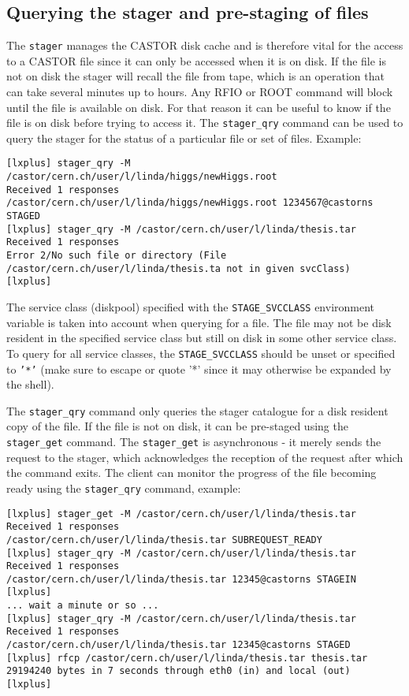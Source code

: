 \subsection{Querying the stager and pre-staging of files}
The {\tt stager} manages the CASTOR disk cache and is therefore vital for the access to a
CASTOR file since it can only be accessed when it is on disk. If the file is not on disk the
stager will recall the file from tape, which is an operation that can take several minutes up
to hours. Any RFIO or ROOT command will block until the file is available on disk. For that
reason it can be useful to know if the file is on disk before trying to access it. 
The {\tt stager\_qry} command can be used to query the stager for the status of a particular 
file or set of files. Example:
\small
\begin{verbatim}
[lxplus] stager_qry -M /castor/cern.ch/user/l/linda/higgs/newHiggs.root
Received 1 responses
/castor/cern.ch/user/l/linda/higgs/newHiggs.root 1234567@castorns STAGED
[lxplus] stager_qry -M /castor/cern.ch/user/l/linda/thesis.tar
Received 1 responses
Error 2/No such file or directory (File /castor/cern.ch/user/l/linda/thesis.ta not in given svcClass)
[lxplus]
\end{verbatim}
\normalsize

The service class (diskpool) specified with the {\tt STAGE\_SVCCLASS} environment variable is
taken into account when querying for a file. The file may not be disk resident in the
specified service class but still on disk in some other service class. To query for
all service classes, the {\tt STAGE\_SVCCLASS} should be unset or specified to {\tt '*'}
(make sure to escape or quote '*' since it may otherwise be expanded by the shell).

The {\tt stager\_qry} command only queries the stager catalogue for a disk resident
copy of the file.
If the file is not on disk, it can be pre-staged using the {\tt stager\_get} command. The 
{\tt stager\_get} is asynchronous - it merely sends the request to the stager, which acknowledges
the reception of the request after which the command exits. The client can monitor the progress
of the file becoming ready using the {\tt stager\_qry} command, example:
\small
\begin{verbatim}
[lxplus] stager_get -M /castor/cern.ch/user/l/linda/thesis.tar
Received 1 responses
/castor/cern.ch/user/l/linda/thesis.tar SUBREQUEST_READY
[lxplus] stager_qry -M /castor/cern.ch/user/l/linda/thesis.tar
Received 1 responses
/castor/cern.ch/user/l/linda/thesis.tar 12345@castorns STAGEIN
[lxplus] 
... wait a minute or so ...
[lxplus] stager_qry -M /castor/cern.ch/user/l/linda/thesis.tar
Received 1 responses
/castor/cern.ch/user/l/linda/thesis.tar 12345@castorns STAGED
[lxplus] rfcp /castor/cern.ch/user/l/linda/thesis.tar thesis.tar
29194240 bytes in 7 seconds through eth0 (in) and local (out)
[lxplus]
\end{verbatim}
\normalsize

